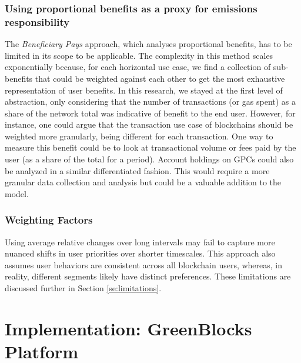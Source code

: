 \documentclass[11pt]{report}
\begin{document}
\subsection{Using proportional benefits as a proxy for emissions responsibility}
The \textit{Beneficiary Pays} approach, which analyses proportional benefits, has to be limited in its scope to be applicable. The complexity in this method scales exponentially because, for each horizontal use case, we find a collection of sub-benefits that could be weighted against each other to get the most exhaustive representation of user benefits. In this research, we stayed at the first level of abstraction, only considering that the number of transactions (or gas spent) as a share of the network total was indicative of benefit to the end user. However, for instance, one could argue that the transaction use case of blockchains should be weighted more granularly, being different for each transaction. One way to measure this benefit could be to look at transactional volume or fees paid by the user (as a share of the total for a period). Account holdings on GPCs could also be analyzed in a similar differentiated fashion. This would require a more granular data collection and analysis but could be a valuable addition to the model.

\subsection{Weighting Factors}
Using average relative changes over long intervals may fail to capture more nuanced shifts in user priorities over shorter timescales. This approach also assumes user behaviors are consistent across all blockchain users, whereas, in reality, different segments likely have distinct preferences. These limitations are discussed further in Section \ref{se:limitations}.




\chapter{Implementation: GreenBlocks Platform}
\end{document}
